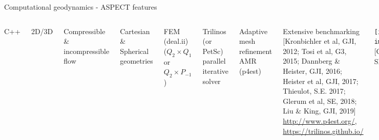 \documentclass[handout]{beamer}
\begin{document}
\begin{frame}[plain]{Computational geodynamics - ASPECT features}

\begin{columns}[onlytextwidth]

C++

2D/3D

Compressible \& incompressible flow

Cartesian \& Spherical geometries

FEM (deal.ii) ($Q_2\times Q_1$ or $Q_2\times P_{-1}$)

Trilinos (or PetSc) parallel iterative solver

Adaptive mesh refinement AMR (p4est)

Extensive benchmarking\\
{\tiny [Kronbichler et al, GJI, 2012; Tosi et al, G3, 2015; Dannberg \& Heister, GJI, 2016; Heister et al, GJI, 2017; Thieulot, S.E. 2017; Glerum et al, SE, 2018; Liu \& King, GJI, 2019]}\\
{\tiny\url{http://www.p4est.org/}, \url{https://trilinos.github.io/}}


\texttt{[image: images/annesubd]}\\
{\tiny [Glerum et al., SE, 2018]}

\end{columns}
\end{frame}
\end{document}
